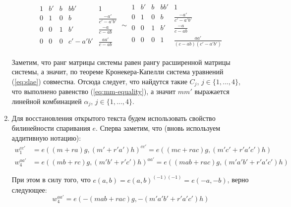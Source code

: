 \documentclass[12pt, a4paper]{extarticle}
\begin{document}
\begin{enumerate}
\begin{equation}
\begin{split}
            \begin{array}{||cccc|c||}
                1 & b' & b & b b'       & 1                      \\
                0 & 1  & 0 & b          & \frac{-a'}{c' - a' b'} \\
                0 & 0  & 1 & b'         & \frac{-a}{c - ab}      \\
                0 & 0  & 0 & c' - a' b' & \frac{a a'}{c - ab}
            \end{array}
            \sim
            \begin{array}{||cccc|c||}
                1 & b' & b & b b' & 1                      \\
                0 & 1  & 0 & b    & \frac{-a'}{c' - a' b'} \\
                0 & 0  & 1 & b'   & \frac{-a}{c - ab}      \\
                0 & 0  & 0 & 1    & \frac{a a'}{(c - ab)(c' - a' b')}
            \end{array}
        \end{split}
        \end{equation}
        
        Заметим, что ранг матрицы системы равен рангу расширенной матрицы системы, а значит,
        по теореме Кронекера-Капелли система уравнений (\ref{eq:slae}) совместна. Отсюда следует,
        что найдутся такие $C_j$, $j \in \{1, ..., 4\}$, что выполнено равенство (\ref{eq:mm-equality}),
        а значит $mm'$ выражается линейной комбинацией $\alpha_j$, $j \in \{1, ..., 4\}$.
        
    \item Для восстановления открытого текста будем использовать свойство билинейности спаривания $e$.
        Сперва заметим, что (вновь используем аддитивную нотацию):
        \begin{equation}
        \begin{split}
            w_1 ^ {c c'} & = e\left((m + r a) g, (m' + r' a') h\right) ^ {c c'} = 
                e\left((m c + r a c) g, (m' c' + r' a' c') h\right) \\
            w_4 ^ {a a'} & = e\left((m b + r c) g, (m' b' + r' c') h\right) ^ {a a'} =
                e\left((m a b + r a c) g, (m' a' b' + r' a' c') h\right)
        \end{split}
        \label{eq:raised-pairings}
        \end{equation}
        
        При этом в силу того, что $e(a, b) = e(a, b) ^ {(-1) (-1)} = e(-a, -b)$, верно следующее:
        \begin{equation}
            w_4 ^ {a a'} = e\left(-(m a b + r a c) g, -(m' a' b' + r' a' c') h\right)
        \label{eq:switched-sign}
        \end{equation}
        

\end{enumerate}
\end{document}
